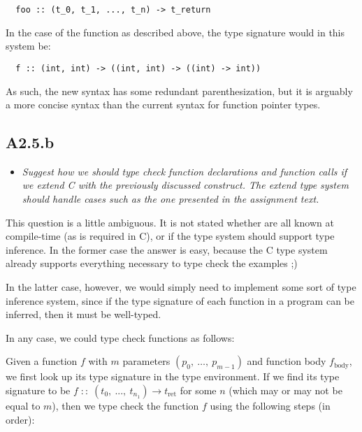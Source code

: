 \begin{verbatim}
  foo :: (t_0, t_1, ..., t_n) -> t_return
\end{verbatim}

In the case of the function  as described above, the type signature would
in this system be:

\begin{verbatim}
  f :: (int, int) -> ((int, int) -> ((int) -> int))
\end{verbatim}

As such, the new syntax has some redundant parenthesization, but it is arguably
a more concise syntax than the current syntax for function pointer types.

\sectend

\newpage

\subsection{A2.5.b}

\begin{itemize}
  \item \emph{Suggest how we should type check function declarations and
    function calls if we extend C with the previously discussed construct. The
    extend type system should handle cases such as the one presented in the
    assignment text.}
\end{itemize}

This question is a little ambiguous. It is not stated whether 
are all known at compile-time (as is required in C), or if the type system
should support type inference. In the former case the answer is easy, because
the C type system already supports everything necessary to type check the
examples ;)

\smallskip

In the latter case, however, we would simply need to implement some sort of type
inference system, since if the type signature of each function in a program can
be inferred, then it must be well-typed.

\bigskip

In any case, we could type check functions as follows:

\smallskip

Given a function $f$ with $m$ parameters $(p_0,\ \dots,\ p_{m - 1})$ and function body
$f_{\text{body}}$, we first look up its type signature in the type environment.
If we find its type signature to be $f\; ::\; (t_0,\ ...,\ t_{n_1}) \to
t_{\text{ret}}$ for some $n$ (which may or may not be equal to $m$), then we type check
the function $f$ using the following steps (in order):

